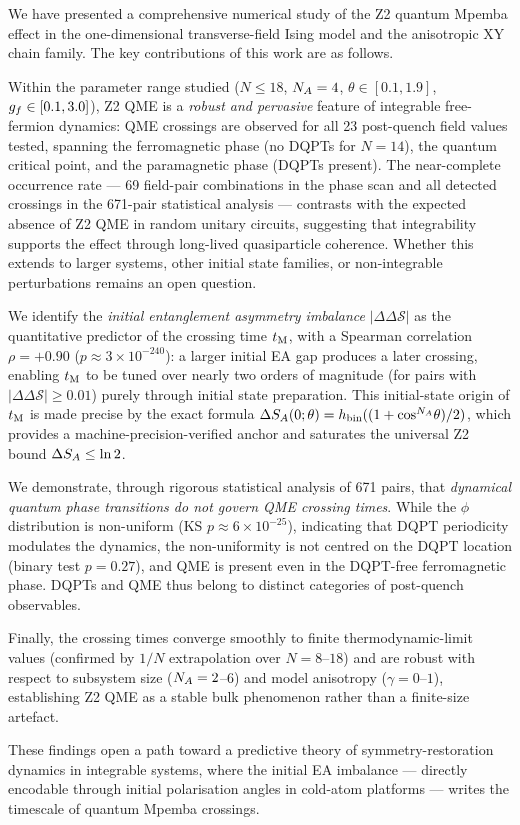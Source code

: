 
We have presented a comprehensive numerical study of the Z2 quantum Mpemba effect
in the one-dimensional transverse-field Ising model and the anisotropic XY chain family.
The key contributions of this work are as follows.

Within the parameter range studied ($N \leq 18$, $N_A = 4$, $\theta \in [0.1, 1.9]$,
$g_f \in [0.1, 3.0]$), Z2 QME is a \emph{robust and pervasive} feature of
integrable free-fermion dynamics: QME crossings are observed for all
23 post-quench field values tested, spanning the ferromagnetic phase (no DQPTs
for $N=14$), the quantum critical point, and the paramagnetic phase (DQPTs present).
The near-complete occurrence rate — 69 field-pair combinations in the phase scan
and all detected crossings in the 671-pair statistical analysis — contrasts
with the expected absence of Z2 QME in random unitary circuits,
suggesting that integrability supports the effect through long-lived quasiparticle
coherence. Whether this extends to larger systems, other initial state families,
or non-integrable perturbations remains an open question.

We identify the \emph{initial entanglement asymmetry imbalance} $|\Delta\Delta\mathcal{S}|$
as the quantitative predictor of the crossing time $t_{\rm M}$, with a Spearman correlation
$\rho = +0.90$ ($p \approx 3 \times 10^{-240}$): a larger initial EA gap produces a
later crossing, enabling $t_{\rm M}$ to be tuned over nearly two orders of magnitude
(for pairs with $|\Delta\Delta\mathcal{S}| \geq 0.01$) purely through initial state preparation.
This initial-state origin of $t_{\rm M}$ is made precise by the exact formula
$\Delta S_A(0;\theta) = h_{\rm bin}((1 + \cos^{N_A}\!\theta)/2)$, which provides a
machine-precision-verified anchor and saturates the universal Z2 bound $\Delta S_A \leq \ln 2$.

We demonstrate, through rigorous statistical analysis of 671 pairs, that
\emph{dynamical quantum phase transitions do not govern QME crossing times}.
While the $\phi$ distribution is non-uniform (KS $p \approx 6 \times 10^{-25}$),
indicating that DQPT periodicity modulates the dynamics, the non-uniformity is
not centred on the DQPT location (binary test $p = 0.27$), and QME is present
even in the DQPT-free ferromagnetic phase.
DQPTs and QME thus belong to distinct categories of post-quench observables.

Finally, the crossing times converge smoothly to finite thermodynamic-limit values
(confirmed by $1/N$ extrapolation over $N = 8$--$18$) and are robust with respect
to subsystem size ($N_A = 2$--$6$) and model anisotropy ($\gamma = 0$--$1$),
establishing Z2 QME as a stable bulk phenomenon rather than a finite-size artefact.

These findings open a path toward a predictive theory of symmetry-restoration
dynamics in integrable systems, where the initial EA imbalance — directly encodable
through initial polarisation angles in cold-atom platforms — writes the timescale
of quantum Mpemba crossings.
